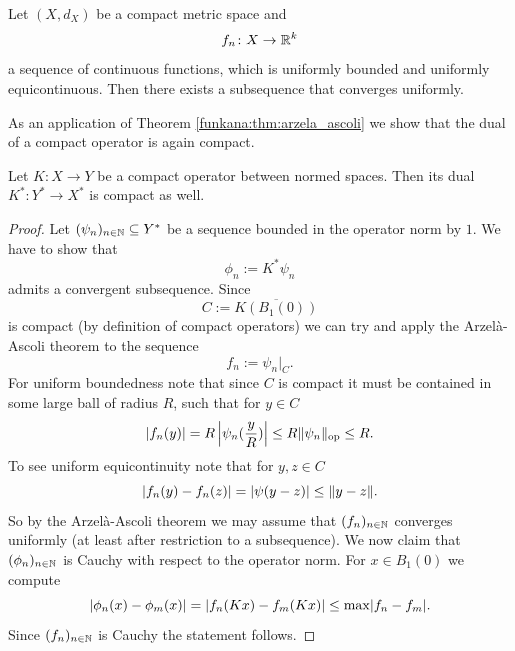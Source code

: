 \begin{theorem}
    Let $(X,d_X)$ be a compact metric space and 
    \[
    f_n \colon X \to \mathbb{R}^k
    \] 
    a sequence of continuous functions, which is uniformly bounded and uniformly equicontinuous. Then there exists a subsequence that converges uniformly.
\end{theorem}

As an application of Theorem \ref{funkana:thm:arzela_ascoli} we show that the dual of a compact operator is again compact.

\begin{lemma}
    Let $K \colon X \to Y$ be a compact operator between normed spaces. Then its dual $K^\ast \colon Y^\ast \to X^\ast$ is compact as well.
\end{lemma}

\begin{proof}
    Let $(\psi_n)_{n\in\mathbb{N}}\subseteq Y^\ast$ be a sequence bounded in the operator norm by $1$. We have to show that 
    \[
    \phi_n := K^\ast\psi_n
    \]
    admits a convergent subsequence. Since 
    \[
    C := \overline{K(B_1(0))}
    \]
    is compact (by definition of compact operators) we can try and apply the Arzelà-Ascoli theorem to the sequence 
    \[
    f_n := \psi_n|_C.
    \]
    For uniform boundedness note that since $C$ is compact it must be contained in some large ball of radius $R$, such that for $y\in C$
    \[
    \lvert f_n(y)\rvert = R \left\lvert \psi_n(\frac{y}{R})\right\lvert \leq R \lVert\psi_n\rVert_\mathrm{op} \leq R.
    \]
    To see uniform equicontinuity note that for $y,z \in C$ 
    \[
    \lvert f_n(y) - f_n(z)\rvert = \lvert\psi(y-z)\rvert \leq \lVert y-z\rVert.
    \]
    So by the Arzelà-Ascoli theorem we may assume that $(f_n)_{n\in\mathbb{N}}$ converges uniformly (at least after restriction to a subsequence). We now claim that $(\phi_n)_{n\in\mathbb{N}}$ is Cauchy with respect to the operator norm. For $x \in B_1(0)$ we compute 
    \[
    \lvert\phi_n(x) - \phi_m(x)\rvert = \lvert f_n(Kx) - f_m(Kx)\rvert \leq \max \lvert f_n-f_m\rvert.
    \]
    Since $(f_n)_{n\in\mathbb{N}}$ is Cauchy the statement follows.
\end{proof}